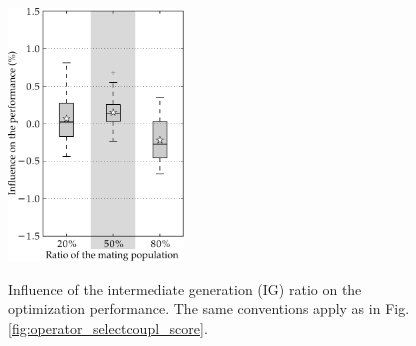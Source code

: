 \documentclass{ametsoc}
\begin{document}
\begin{figure}[t]
	\begin{center}
		\noindent\includegraphics[width=11pc,angle=0]{fig16.pdf}\\
	\end{center}
	\caption{Influence of the intermediate generation (IG) ratio on the optimization performance. The same conventions apply as in Fig. \ref{fig:operator_selectcoupl_score}.}
	\label{fig:option_popratio_score}
\end{figure}
\end{document}

